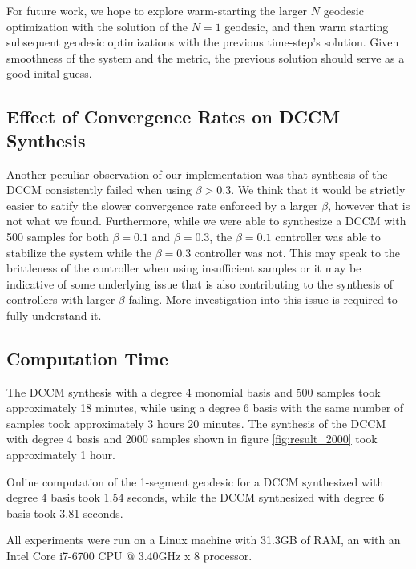 \documentclass[journal]{IEEEtran}
\begin{document}
For future work, we hope to explore warm-starting the larger $N$ geodesic optimization with the solution of the $N=1$ geodesic, and then warm starting subsequent geodesic optimizations with the previous time-step's solution. Given smoothness of the system and the metric, the previous solution should serve as a good inital guess.

\subsection{Effect of Convergence Rates on DCCM Synthesis}
Another peculiar observation of our implementation was that synthesis of the DCCM consistently failed when using $\beta > 0.3$. We think that it would be strictly easier to satify the slower convergence rate enforced by a larger $\beta$, however that is not what we found. Furthermore, while we were able to synthesize a DCCM with 500 samples for both $\beta = 0.1$ and $\beta = 0.3$, the $\beta = 0.1$ controller was able to stabilize the system while the $\beta = 0.3$ controller was not. This may speak to the brittleness of the controller when using insufficient samples or it may be indicative of some underlying issue that is also contributing to the synthesis of controllers with larger $\beta$ failing. More investigation into this issue is required to fully understand it.

\subsection{Computation Time}
The DCCM synthesis with a degree 4 monomial basis and 500 samples took approximately 18 minutes, while using a degree 6 basis with the same number of samples took approximately 3 hours 20 minutes. The synthesis of the DCCM with degree 4 basis and 2000 samples shown in figure \ref{fig:result_2000} took approximately 1 hour.

Online computation of the 1-segment geodesic for a DCCM synthesized with degree 4 basis took 1.54 seconds, while the DCCM synthesized with degree 6 basis took 3.81 seconds.

All experiments were run on a Linux machine with 31.3GB of RAM, an with an Intel Core i7-6700 CPU @ 3.40GHz x 8 processor.
\end{document}
